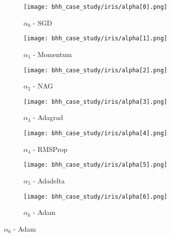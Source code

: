 \begin{figure}[htbp]
      \begin{subfigure}{0.5\textwidth}
            \centering
            \texttt{[image: bhh\_case\_study/iris/alpha[0].png]}
            \caption{$\alpha_{0}$ - \Acs{SGD}}
            \label{fig:results:case_study:iris:alpha:0}
      \end{subfigure}
      \begin{subfigure}{0.5\textwidth}
            \centering
            \texttt{[image: bhh\_case\_study/iris/alpha[1].png]}
            \caption{$\alpha_{1}$ - \Acs{Momentum}}
            \label{fig:results:case_study:iris:alpha:1}
      \end{subfigure}
      \par\bigskip
      \begin{subfigure}{0.5\textwidth}
            \centering
            \texttt{[image: bhh\_case\_study/iris/alpha[2].png]}
            \caption{$\alpha_{2}$ - \Acs{NAG}}
            \label{fig:results:case_study:iris:alpha:2}
      \end{subfigure}
      \begin{subfigure}{0.5\textwidth}
            \centering
            \texttt{[image: bhh\_case\_study/iris/alpha[3].png]}
            \caption{$\alpha_{3}$ - \Acs{Adagrad}}
            \label{fig:results:case_study:iris:alpha:3}
      \end{subfigure}
      \par\bigskip
      \begin{subfigure}{0.5\textwidth}
            \centering
            \texttt{[image: bhh\_case\_study/iris/alpha[4].png]}
            \caption{$\alpha_{4}$ - \Acs{RMSProp}}
            \label{fig:results:case_study:iris:alpha:4}
      \end{subfigure}
      \begin{subfigure}{0.5\textwidth}
            \centering
            \texttt{[image: bhh\_case\_study/iris/alpha[5].png]}
            \caption{$\alpha_{5}$ - \Acs{Adadelta}}
            \label{fig:results:case_study:iris:alpha:5}
      \end{subfigure}
      \par\bigskip
      \begin{subfigure}{0.5\textwidth}
            \centering
            \texttt{[image: bhh\_case\_study/iris/alpha[6].png]}
            \caption{$\alpha_{6}$ - \Acs{Adam}}
            \label{fig:results:case_study:iris:alpha:6}

\end{subfigure}
\end{figure}
